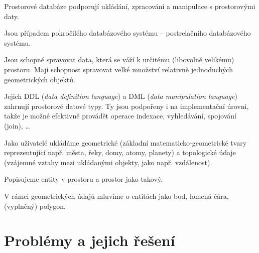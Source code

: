 \begin{compactitem}
    \item Prostorové databáze podporují ukládání, zpracování a manipulace s prostorovými daty.

    \item Jsou případem pokročilého databázového systému -- postrelačního databázového systému.

    \item Jsou schopné spravovat data, která se váží k určitému (libovolně velikému) prostoru. Mají schopnost spravovat velké množství relativně jednoduchých geometrických objektů.

    \item Jejich DDL (\textit{data definition language}) a DML (\textit{data manipulation language}) zahrnují prostorové datové typy. Ty jsou podpořeny i na implementační úrovni, takže je možné efektivně provádět operace indexace, vyhledávání, spojování (join), \dots

    \item Jako uživatelé ukládáme geometrické (základní matematicko-geometrické tvary reprezentující např. města, řeky, domy, atomy, planety) a topologické údaje (vzájemné vztahy mezi ukládanými objekty, jako např. vzdálenost). \begin{compactitem}
        \item Popisujeme entity v prostoru a prostor jako takový.
        \item V rámci geometrických údajů mluvíme o entitách jako bod, lomená čára, (vyplněný) polygon.
    \end{compactitem}
\end{compactitem}


\section{Problémy a jejich řešení}

